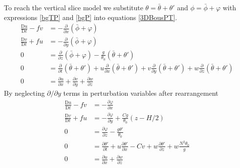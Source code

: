 To reach the vertical slice model we substitute $\theta = \bar{\theta} + \theta'$ and $\phi = \bar{\phi} + \varphi$ with expressions \ref{bgTP} and \ref{bgP} into equations \ref{3DBousPT}. 
\begin{equation}
	\begin{aligned}
		\frac{\mathrm{D}u}{\mathrm{D}t}	- fv  &= -\frac{\partial}{\partial x}\left(\bar{\phi} + \varphi\right)
		\\
		\frac{\mathrm{D}v}{\mathrm{D}t}	+ fu  &= -\frac{\partial}{\partial y}\left(\bar{\phi} + \varphi\right)
		\\
		0 &=\frac{\partial}{\partial z}\left(\bar{\phi} + \varphi\right) - \frac{g}{\theta_0}\left(\bar{\theta} + \theta'\right)
		\\
		0 & =\frac{\partial }{\partial t}\left(\bar{\theta} + \theta'\right) +u\frac{\partial }{\partial x}\left(\bar{\theta} + \theta'\right) + v\frac{\partial }{\partial y}\left(\bar{\theta} + \theta'\right) + w\frac{\partial }{\partial z}\left(\bar{\theta} + \theta'\right)
		\\
		0 &= \frac{\partial u}{\partial x} + \frac{\partial v}{\partial y} + \frac{\partial w}{\partial z}
	\end{aligned}
\end{equation}
By neglecting $\partial/\partial y$ terms in perturbation variables after rearrangement 
\begin{equation}
	\begin{aligned}
		\frac{\mathrm{D}u}{\mathrm{D}t}	- fv  &= -\frac{\partial \varphi}{\partial x}
		\\
		\frac{\mathrm{D}v}{\mathrm{D}t}	+ fu  &= -\frac{\partial \varphi}{\partial y} + \frac{Cg}{\theta_0}\left(z - H/2\right)
		\\
		0 &=\frac{\partial \varphi}{\partial z} - \frac{g\theta'}{\theta_0}
		\\
		0 & =\frac{\partial \theta'}{\partial t} +u\frac{\partial \theta'}{\partial x} - Cv + w\frac{\partial \theta'}{\partial z} + w\frac{N^2\theta_0}{g}
		\\
		0 &= \frac{\partial u}{\partial x} + \frac{\partial w}{\partial z}
	\end{aligned}
\label{VerticalSlice}
\end{equation}
